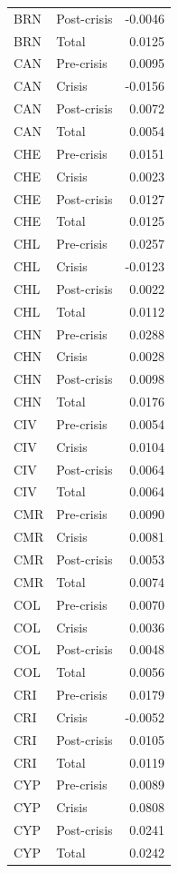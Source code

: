 \begin{longtable}[t]{llr}
BRN & Post-crisis & -0.0046\\
\addlinespace
BRN & Total & 0.0125\\
CAN & Pre-crisis & 0.0095\\
CAN & Crisis & -0.0156\\
CAN & Post-crisis & 0.0072\\
CAN & Total & 0.0054\\
\addlinespace
CHE & Pre-crisis & 0.0151\\
CHE & Crisis & 0.0023\\
CHE & Post-crisis & 0.0127\\
CHE & Total & 0.0125\\
CHL & Pre-crisis & 0.0257\\
\addlinespace
CHL & Crisis & -0.0123\\
CHL & Post-crisis & 0.0022\\
CHL & Total & 0.0112\\
CHN & Pre-crisis & 0.0288\\
CHN & Crisis & 0.0028\\
\addlinespace
CHN & Post-crisis & 0.0098\\
CHN & Total & 0.0176\\
CIV & Pre-crisis & 0.0054\\
CIV & Crisis & 0.0104\\
CIV & Post-crisis & 0.0064\\
\addlinespace
CIV & Total & 0.0064\\
CMR & Pre-crisis & 0.0090\\
CMR & Crisis & 0.0081\\
CMR & Post-crisis & 0.0053\\
CMR & Total & 0.0074\\
\addlinespace
COL & Pre-crisis & 0.0070\\
COL & Crisis & 0.0036\\
COL & Post-crisis & 0.0048\\
COL & Total & 0.0056\\
CRI & Pre-crisis & 0.0179\\
\addlinespace
CRI & Crisis & -0.0052\\
CRI & Post-crisis & 0.0105\\
CRI & Total & 0.0119\\
CYP & Pre-crisis & 0.0089\\
CYP & Crisis & 0.0808\\
\addlinespace
CYP & Post-crisis & 0.0241\\
CYP & Total & 0.0242\\

\end{longtable}
